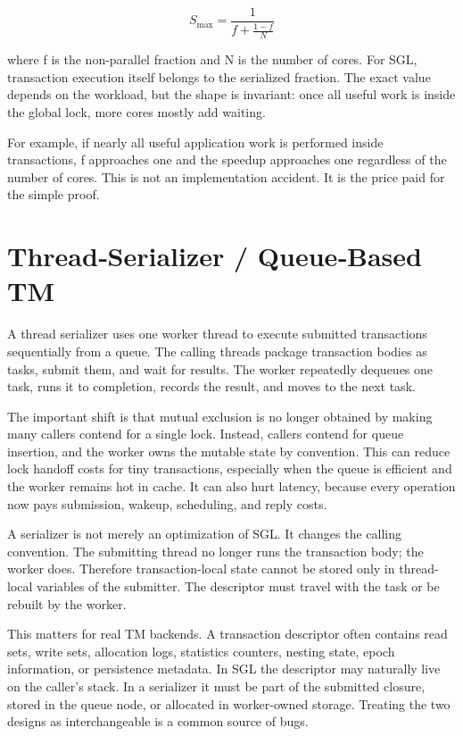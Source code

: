 $$
S_{\max} = \frac{1}{f + \frac{1-f}{N}}
$$

where f is the non-parallel fraction and N is the number of cores. For SGL, transaction execution itself belongs to the serialized fraction. The exact value depends on the workload, but the shape is invariant: once all useful work is inside the global lock, more cores mostly add waiting.

For example, if nearly all useful application work is performed inside transactions, f approaches one and the speedup approaches one regardless of the number of cores. This is not an implementation accident. It is the price paid for the simple proof.

\section{Thread‑Serializer / Queue‑Based TM}

A thread serializer uses one worker thread to execute submitted transactions sequentially from a queue. The calling threads package transaction bodies as tasks, submit them, and wait for results. The worker repeatedly dequeues one task, runs it to completion, records the result, and moves to the next task.

The important shift is that mutual exclusion is no longer obtained by making many callers contend for a single lock. Instead, callers contend for queue insertion, and the worker owns the mutable state by convention. This can reduce lock handoff costs for tiny transactions, especially when the queue is efficient and the worker remains hot in cache. It can also hurt latency, because every operation now pays submission, wakeup, scheduling, and reply costs.

A serializer is not merely an optimization of SGL. It changes the calling convention. The submitting thread no longer runs the transaction body; the worker does. Therefore transaction-local state cannot be stored only in thread-local variables of the submitter. The descriptor must travel with the task or be rebuilt by the worker.

This matters for real TM backends. A transaction descriptor often contains read sets, write sets, allocation logs, statistics counters, nesting state, epoch information, or persistence metadata. In SGL the descriptor may naturally live on the caller's stack. In a serializer it must be part of the submitted closure, stored in the queue node, or allocated in worker-owned storage. Treating the two designs as interchangeable is a common source of bugs.

